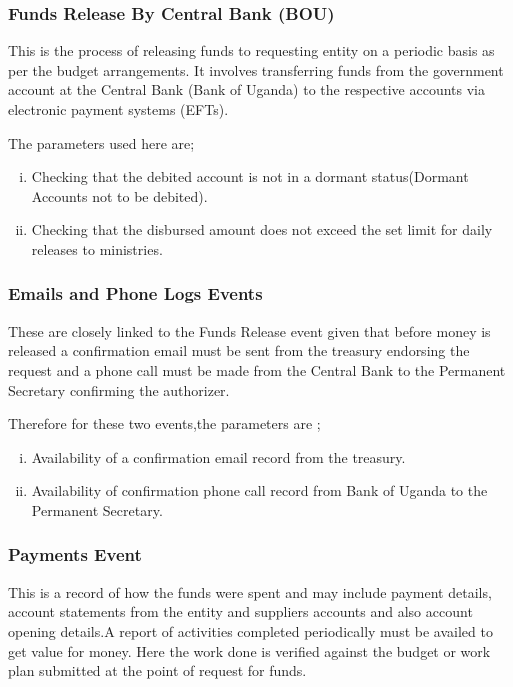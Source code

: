 \subsubsection{Funds Release By Central Bank (BOU)}

\noindent This is the process of releasing funds to requesting entity on a periodic basis as per the budget arrangements. It involves transferring funds from the government account at the Central Bank (Bank of Uganda) to the respective accounts via electronic payment systems (EFTs).

\noindent The parameters used here are;

\begin{enumerate}[(i)]
\item Checking that the debited account is not in a dormant status(Dormant Accounts not to be debited).
\item Checking that the disbursed amount does not exceed the set limit for daily releases to ministries.
\end{enumerate}

\subsubsection{Emails and Phone Logs Events}

\noindent These are closely linked to the Funds Release event given that before money is released a confirmation email must be sent from the treasury endorsing the request and a phone call must be made from the Central Bank to the Permanent Secretary confirming the authorizer.

\noindent Therefore for these two events,the parameters are ;

\begin{enumerate}[(i)]
\item Availability of a confirmation email record from the treasury.
\item Availability of confirmation phone call record from Bank of Uganda to the Permanent Secretary.
\end{enumerate}

\subsubsection{Payments Event}

\noindent This is a record of how the funds were spent and may include payment details, account statements from the entity and suppliers accounts and also account opening details.A report of activities completed periodically must be availed to get value for money. Here the work done is verified against the budget or work plan submitted at the point of request for funds.

